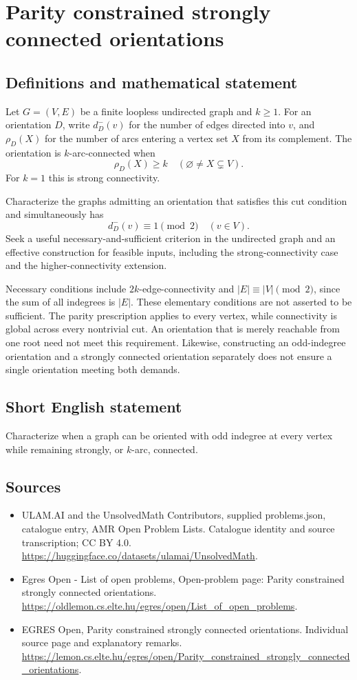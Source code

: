 \documentclass[11pt,a4paper]{article}
\begin{document}
\section*{Parity constrained strongly connected orientations}\label{statement}

\subsection{Definitions and mathematical statement}
Let $G=(V,E)$ be a finite loopless undirected graph and $k\ge1$.
For an orientation $D$, write $d_D^-(v)$ for the number of edges
directed into $v$, and $\rho_D(X)$ for the number of arcs entering
a vertex set $X$ from its complement. The orientation is
$k$-arc-connected when
\[
                            \rho_D(X)\ge k
                                  \quad(\varnothing\ne X\subsetneq V).
\]
For $k=1$ this is strong connectivity.

Characterize the graphs admitting an orientation that satisfies this
cut condition and simultaneously has
\[
                           d_D^-(v)\equiv1\pmod2
                                          \quad(v\in V).
\]
Seek a useful necessary-and-sufficient criterion in the undirected
graph and an effective construction for feasible inputs, including
the strong-connectivity case and the higher-connectivity extension.

Necessary conditions include $2k$-edge-connectivity and
$|E|\equiv |V|\pmod2$, since the sum of all indegrees is $|E|$.
These elementary conditions are not asserted to be sufficient.
The parity prescription applies to every vertex, while connectivity
is global across every nontrivial cut. An orientation that is merely
reachable from one root need not meet this requirement. Likewise,
constructing an odd-indegree orientation and a strongly connected
orientation separately does not ensure a single orientation meeting
both demands.
\subsection{Short English statement}
Characterize when a graph can be oriented with odd indegree at
every vertex while remaining strongly, or $k$-arc, connected.
\subsection{Sources}
\begin{itemize}
\item[S1] ULAM.AI and the UnsolvedMath Contributors, supplied problems.json, catalogue entry, AMR Open Problem Lists. Catalogue identity and source transcription; CC BY 4.0.
\url{https://huggingface.co/datasets/ulamai/UnsolvedMath}.
\item[S2] Egres Open - List of open problems, Open-problem page: Parity constrained strongly connected orientations. 
\url{https://oldlemon.cs.elte.hu/egres/open/List_of_open_problems}.
\item[S3] EGRES Open, Parity constrained strongly connected orientations. Individual source page and explanatory remarks.
\url{https://lemon.cs.elte.hu/egres/open/Parity_constrained_strongly_connected_orientations}.
\end{itemize}
\end{document}
